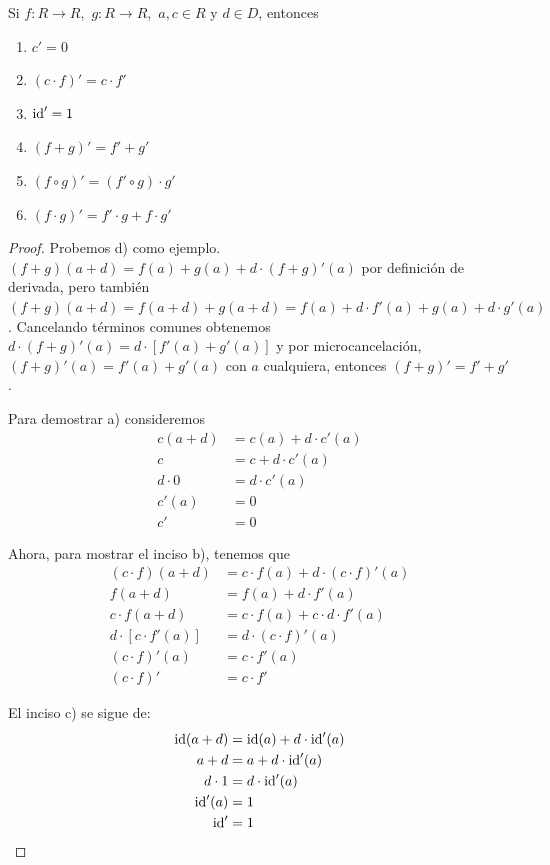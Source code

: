 \begin{theorem}[label=thm:reglasderivada]
  Si $f\colon  R\to R$,\ $g\colon  R\to R$,\ $a,c\in R$ y $d\in D$, entonces
\begin{enumerate}[label=\textbf{\alph*)}]
    \item $c' = 0$
    \item $(c\cdot f)' =c\cdot f'$
    \item $\operatorname{id}' = 1$
    \item $(f+g)'=f'+g'$
    \item $(f\circ g)' =(f'\circ g)\cdot g'$
    \item $(f\cdot g)' =f'\cdot g+f\cdot g'$
\end{enumerate}
\end{theorem}
\begin{proof}
  Probemos d) como ejemplo. $(f+g)(a+d) = f(a)+g(a)+d\cdot (f+g)'(a)$
  por definición de derivada, pero también $(f+g)(a+d) = f(a+d)+g(a+d)=f(a)+d\cdot f'(a)+g(a)
  +d\cdot g'(a)$. Cancelando términos comunes obtenemos $d\cdot (f+g)'(a) = d \cdot[f'(a)+g'(a)]$
  y por microcancelación, $(f+g)'(a)=f'(a)+g'(a)$ con $a$ cualquiera, entonces
  $(f+g)'=f'+g'$.
  
  Para demostrar a) consideremos
  \begin{align*}
   c(a+d) &= c(a)+d\cdot c'(a)\\
    c &= c+d\cdot c'(a)\\
    d\cdot 0 &= d\cdot c'(a)\\
    c'(a) &= 0\\
    c' &= 0
  \end{align*}

  Ahora, para mostrar el inciso b), tenemos que
  \begin{align*}
     (c\cdot f)(a+d) &= c\cdot f(a)+d\cdot (c\cdot f)'(a)\\
      f(a+d) &= f(a)+d\cdot f'(a)\\
      c\cdot f(a+d) &= c\cdot f(a)+ c\cdot d\cdot f'(a)\\
      d\cdot [c\cdot f'(a)] &= d\cdot (c\cdot f)'(a)\\
      (c\cdot f)'(a) &=c\cdot f'(a)\\
      (c\cdot f)' &=c\cdot f' 
  \end{align*}

  El inciso c) se sigue de:
  \begin{align*}
     \operatorname{id} (a+d) &= \operatorname{id} (a)+d\cdot \operatorname{id} '(a)\\
      a+d &= a+d\cdot \operatorname{id} '(a)\\
      d\cdot 1 &= d\cdot \operatorname{id} '(a)\\
      \operatorname{id} '(a) &= 1\\
      \operatorname{id} ' &= 1\\
  \end{align*}


\end{proof}
